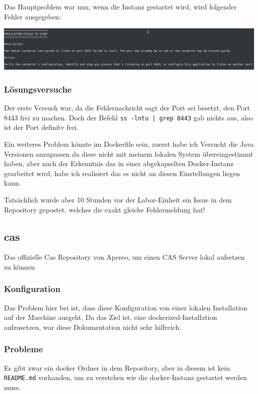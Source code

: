 Das Hauptproblem war nun, wenn die Instanz gestartet wird, wird folgender Fehler ausgegeben:

\begin{minipage}{\linewidth}
	\centering
	\includegraphics[width=1\linewidth]{images/failed_1}
\end{minipage}

\subsubsection{Lösungsversuche}
Der erste Versuch war, da die Fehlernachricht sagt der Port sei besetzt, den Port 8443 frei zu machen. Doch der Befehl \verb=ss -lntu | grep 8443= gab nichts aus, also ist der Port definitv frei.

Ein weiteres Problem könnte im Dockerfile sein, zuerst habe ich Versucht die Java Versionen anzupassen da diese nicht mit meinem lokalen System übereingestimmt haben, aber nach der Erkenntnis das in einer abgekapselten Docker-Instanz gearbeitet wird, habe ich realisiert das es nicht an diesen Einstellungen liegen kann.

Tatsächlich wurde aber 10 Stunden vor der Labor-Einheit ein Issue\cite{Deric-dominic} in dem Repository gepostet, welches die exakt gleiche Fehlermeldung hat!

\subsection{cas}
\cite{Apereoa}

Das offizielle Cas Repository von Apereo, um einen CAS Server lokal aufsetzen zu können
\subsubsection{Konfiguration}
\cite{Apereob}

Das Problem hier bei ist, dass diese Konfiguration von einer lokalen Installation auf der Maschine ausgeht. Da das Ziel ist, eine dockerized-Installation aufzusetzen, war diese Dokumentation nicht sehr hilfreich.

\subsubsection{Probleme}
Es gibt zwar ein docker Ordner in dem Repository, aber in diesem ist kein \verb|README.md| vorhanden, um zu verstehen wie die docker-Instanz gestartet werden muss. 

